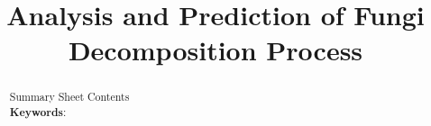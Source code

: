 \documentclass[12pt]{article}
\title{Analysis and Prediction of Fungi Decomposition Process}
\begin{document}
	\begin{abstract}
		Summary Sheet Contents\\
		\vspace{5pt}
		\textbf{Keywords}:
	\end{abstract}
	
	\maketitle
	\tableofcontents
	
	
	
	
	
	
	
	
\end{document}

